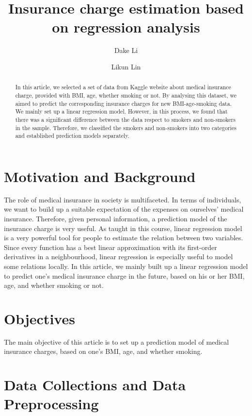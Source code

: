 \documentclass[12pt,a4paper]{article}
\title{Insurance charge estimation based on regression analysis}
\author[1]{Dake Li}
\author[2]{Likun Lin}
\affil[1]{Department of Mathematics, Fudan University}
\affil[2]{Department of Mathematics, City University of Hong Kong}
\begin{document}
\maketitle

\begin{abstract}
In this article, we selected a set of data from Kaggle website about medical insurance charge, provided with BMI, age, whether smoking or not. By analysing this dataset, we aimed to predict the corresponding insurance charges for new BMI-age-smoking data. We mainly set up a linear regression model. However, in this process, we found that there was a significant difference between the data respect to smokers and non-smokers in the sample. Therefore, we classified the smokers and non-smokers into two categories and established prediction models separately.
\end{abstract}

\indent
\section{Motivation and Background}
The role of medical insurance in society is multifaceted. In terms of individuals, we want to build up a suitable expectation of the expenses on ourselves' medical insurance. Therefore, given personal information, a prediction model of the insurance charge is very useful. As taught in this course, linear regression model is a very powerful tool for people to estimate the relation between two variables. Since every function has a best linear approximation with its first-order derivatives in a neighbourhood, linear regression is especially useful to model some relations locally. In this article, we mainly built up a linear regression model to predict one's medical insurance charge in the future, based on his or her BMI, age, and whether smoking or not.

\section{Objectives}
The main objective of this article is to set up a prediction model of medical insurance charges, based on one's BMI, age, and whether smoking.

\section{Data Collections and Data Preprocessing}
\end{document}
